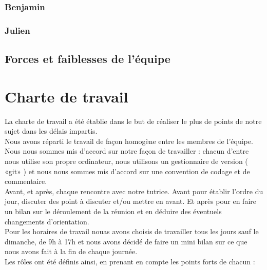 \documentclass[a4paper,10pt]{article}
\begin{document}
\subsubsection{Benjamin}
\subsubsection{Julien}


\subsection{Forces et faiblesses de l'équipe}


\section{Charte de travail}
La charte de travail a été établie dans le but de réaliser le plus de
points de notre sujet dans les délais impartis.  \\

Nous avons réparti le travail de façon homogène entre les membres de
l'équipe.  Nous nous sommes mis d'accord sur notre façon de travailler
: chacun d'entre nous utilise son propre ordinateur, nous utilisons un
gestionnaire de version ( «git» ) et nous nous sommes mis d'accord sur
une convention de codage et de commentaire. \\

Avant, et après, chaque rencontre avec notre tutrice. Avant pour
établir l'ordre du jour, discuter des point à discuter et/ou mettre en
avant. Et après pour en faire un bilan sur le déroulement de la
réunion et en déduire des éventuels changements d'orientation. \\

Pour les horaires de travail nouas avons choisis de travailler tous
les jours sauf le dimanche, de 9h à 17h et nous avons décidé de faire
un mini bilan sur ce que nous avons fait à la fin de chaque journée.\\

Les rôles ont été définis ainsi, en prenant en compte les points forts
de chacun :\\
\end{document}
